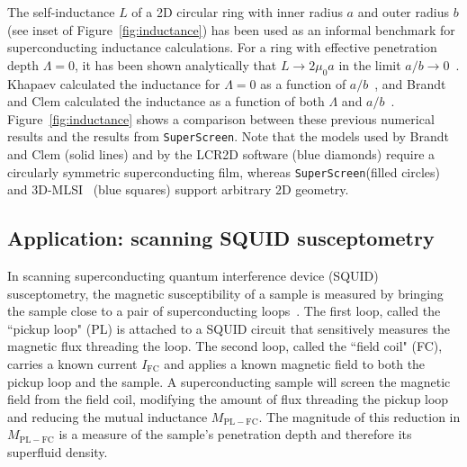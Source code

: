 \documentclass[final,3p,times,twocolumn]{elsarticle}
\newcommand{\inline}[1]{\texttt{#1}\xspace}
\newcommand{\SuperScreen}{\inline{SuperScreen}}
\begin{document}
The self-inductance $L$ of a 2D circular ring with inner radius $a$ and outer radius $b$ (see inset of Figure~\ref{fig:inductance}) has been used as an informal benchmark for superconducting inductance calculations. For a ring with effective penetration depth $\Lambda = 0$, it has been shown analytically that $L\to 2\mu_0 a$ in the limit $a/b\to 0$~\cite{Ketchen2012-mb, Babaei_Brojeny2003-la}. Khapaev calculated the inductance for $\Lambda = 0$ as a function of $a/b$~\cite{Khapaev1997-kw}, and Brandt and Clem calculated the inductance as a function of both $\Lambda$ and $a / b$~\cite{Brandt2004-ew}. Figure~\ref{fig:inductance} shows a comparison between these previous numerical results and the results from \SuperScreen. Note that the models used by Brandt and Clem (solid lines) and by the LCR2D software (blue diamonds) require a circularly symmetric superconducting film, whereas \SuperScreen (filled circles) and 3D-MLSI~\cite{Khapaev1997-kw, Khapaev2001-xq, Khapaev2001-pw} (blue squares) support arbitrary 2D geometry. 

\subsection{Application: scanning SQUID susceptometry}
\label{section:examples:scanning-squid}

In scanning superconducting quantum interference device (SQUID) susceptometry, the magnetic susceptibility of a sample is measured by bringing the sample close to a pair of superconducting loops~\cite{Gardner2001-gr, Huber2008-il, Kirtley_Kalisky_2012}. The first loop, called the ``pickup loop" (PL) is attached to a SQUID circuit that sensitively measures the magnetic flux threading the loop. The second loop, called the ``field coil" (FC), carries a known current $I_\mathrm{FC}$ and applies a known magnetic field to both the pickup loop and the sample. A superconducting sample will screen the magnetic field from the field coil, modifying the amount of flux threading the pickup loop and reducing the mutual inductance $M_\mathrm{PL-FC}$. The magnitude of this reduction in $M_\mathrm{PL-FC}$ is a measure of the sample's penetration depth and therefore its superfluid density.
\end{document}
